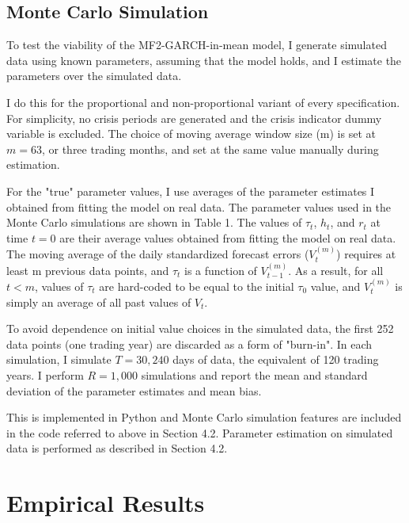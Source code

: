 \documentclass[12pt]{article}
\begin{document}
\subsection{Monte Carlo Simulation}
To test the viability of the MF2-GARCH-in-mean model, I generate simulated data using known parameters, assuming that the model holds, and I estimate the parameters over the simulated data.\par
I do this for the proportional and non-proportional variant of every specification. For simplicity, no crisis periods are generated and the crisis indicator dummy variable is excluded. The choice of moving average window size (m) is set at $m=63$, or three trading months, and set at the same value manually during estimation.\par
For the "true" parameter values, I use averages of the parameter estimates I obtained from fitting the model on real data. The parameter values used in the Monte Carlo simulations are shown in Table 1. The values of $\tau_t$, $h_t$, and $r_t$ at time $t=0$ are their average values obtained from fitting the model on real data. The moving average of the daily standardized forecast errors ($V_t^{(m)}$) requires at least m previous data points, and $\tau_t$ is a function of $V_{t-1}^{(m)}$. As a result, for all $t<m$, values of $\tau_t$ are hard-coded to be equal to the initial $\tau_0$ value, and $V_t^{(m)}$ is simply an average of all past values of $V_t$.\par
To avoid dependence on initial value choices in the simulated data, the first 252 data points (one trading year) are discarded as a form of "burn-in". In each simulation, I simulate $T=30,240$ days of data, the equivalent of 120 trading years. I perform $R=1,000$ simulations and report the mean and standard deviation of the parameter estimates and mean bias.\par
This is implemented in Python and Monte Carlo simulation features are included in the code referred to above in Section 4.2. Parameter estimation on simulated data is performed as described in Section 4.2.


\section{Empirical Results}
\end{document}
